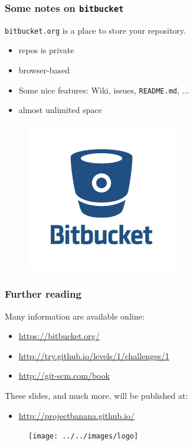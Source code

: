 \documentclass{beamer}
\begin{document}
\begin{frame}
 \frametitle{Some notes on \texttt{bitbucket}}
 \vspace{1.5cm}
 \texttt{bitbucket.org} is a place to store your repository.
 \begin{itemize}
  \item repos is {\color{red}private}
  \item browser-based
  \item Some nice features: Wiki, issues, \texttt{README.md}, ...
  \item almost unlimited space
 \end{itemize}
\begin{figure}
\hfill \includegraphics[scale=0.35]{images/bitbucket-logo}
\end{figure}
\end{frame}


% 
\begin{frame}
\frametitle{Further reading}
Many information are available online:
\begin{itemize}
 \item \url{https://bitbucket.org/}
 \item \url{http://try.github.io/levels/1/challenges/1}
 \item \url{http://git-scm.com/book}
\end{itemize}
These slides, and much more, will be published at:
\begin{itemize}
 \item \url{http://projectbanana.github.io/}
\end{itemize}
 \begin{figure}
\centering
 \texttt{[image: ../../images/logo]}
\end{figure}
\end{frame}
\end{document}
